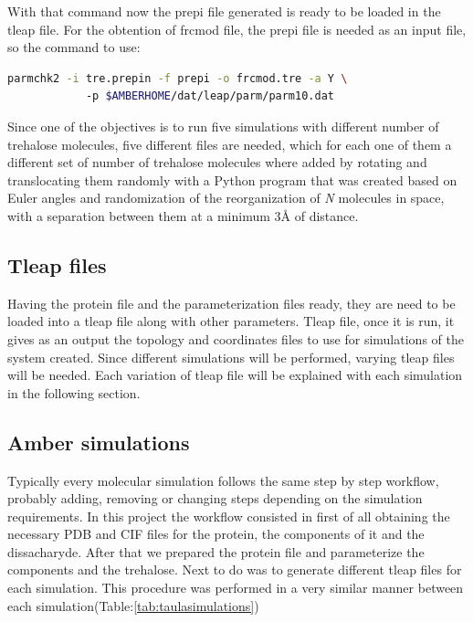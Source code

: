 \documentclass[a4paper]{article}
\begin{document}
With that command now the prepi file generated is ready to be loaded in the tleap file. For the obtention of frcmod file, the prepi file is needed as an input file, so the command to use:

\begin{lstlisting}[language=Bash,caption={Trehalose parmchk2}]
   parmchk2 -i tre.prepin -f prepi -o frcmod.tre -a Y \ 
            -p $AMBERHOME/dat/leap/parm/parm10.dat
\end{lstlisting}

Since one of the objectives is to run five simulations with different number of trehalose molecules, five different files are needed, which for each one of them a different set of number of trehalose molecules where added by rotating and translocating them randomly with a Python program that was created based on Euler angles and randomization of the reorganization of \textit{N} molecules in space, with a separation between them at a minimum 3Å of distance.


\subsection{Tleap files}

Having the protein file and the parameterization files ready, they are need to be loaded into a tleap file along with other parameters. Tleap file, once it is run, it gives as an output the topology and coordinates files to use for simulations of the system created. Since different simulations will be performed, varying tleap files will be needed. Each variation of tleap file will be explained with each simulation in the following section.

\subsection{Amber simulations}

Typically every molecular simulation follows the same step by step workflow, probably adding, removing or changing steps depending on the simulation requirements.
In this project the workflow consisted in first of all obtaining the necessary PDB and CIF files for the protein, the components of it and the dissacharyde. After that we prepared the protein file and parameterize the components and the trehalose. Next to do was to generate different tleap files for each simulation. This procedure was performed in a very similar manner between each simulation(Table:\ref{tab:taulasimulations})
\end{document}
